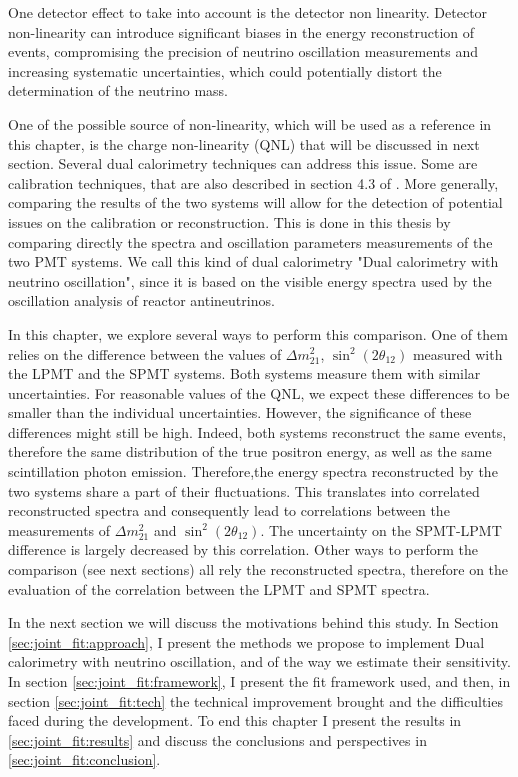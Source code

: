 \documentclass[../main.tex]{subfiles}
\begin{document}
One detector effect to take into account is the detector  non linearity. Detector non-linearity can introduce significant biases in the energy reconstruction of events, compromising the precision of neutrino oscillation measurements and increasing systematic uncertainties, which could potentially distort the determination of the neutrino mass.

One of the possible source of non-linearity, which will be used as a reference in this chapter, is the charge non-linearity (QNL) that will be discussed in next section.
Several dual calorimetry techniques can address this issue. Some are calibration techniques, that are also described in section 4.3 of \cite{han_dual_2021} .
More generally, comparing the results of the two systems will allow for the detection of potential issues on the calibration or reconstruction. This is done in this thesis by comparing directly the spectra and oscillation parameters measurements of the two PMT systems. We call this kind of dual calorimetry "Dual calorimetry with neutrino oscillation", since it is based on the visible energy spectra used by the oscillation analysis of reactor antineutrinos.

In this chapter, we explore several ways to perform this comparison. One of them relies on the difference between the values of $\Delta m^2_{21}$, $\sin^2(2\theta_{12})$ measured with the LPMT and the SPMT systems.
Both systems measure them with similar uncertainties. For reasonable values of the QNL, we expect these differences to be smaller than the individual uncertainties. However, the significance of these differences might still be high. Indeed, both systems reconstruct the same events, therefore the same distribution of the true positron energy, as well as the same scintillation photon emission. Therefore,the energy spectra reconstructed by the two systems share a part of their fluctuations. This translates into correlated reconstructed spectra and consequently lead to correlations between the measurements of $\Delta m^2_{21}$ and $\sin^2(2\theta_{12})$. The uncertainty on the SPMT-LPMT difference is largely decreased by this correlation.  Other ways to perform the comparison
(see next sections) all rely the reconstructed spectra, therefore on the evaluation of the correlation between the LPMT and SPMT spectra.

In the next section we will discuss the motivations behind this study. In Section \ref{sec:joint_fit:approach},  I present the methods we propose to implement Dual calorimetry with neutrino oscillation, and of the way we estimate their sensitivity. In section \ref{sec:joint_fit:framework}, I present the fit framework used, and then, in section \ref{sec:joint_fit:tech} the technical improvement brought and the difficulties faced during the development. To end this chapter I present the results in \ref{sec:joint_fit:results} and discuss the conclusions and perspectives in \ref{sec:joint_fit:conclusion}.
\end{document}
